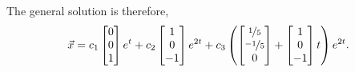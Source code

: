 \begin{exampleSol}
The general solution is therefore,
\begin{equation*}
\vec{x} =
c_1
\begin{bmatrix} 0 \\ 0 \\ 1 \end{bmatrix}
e^t
+
c_2 
\begin{bmatrix} 1 \\ 0 \\ -1 \end{bmatrix}
e^{2t}
+
c_3
\left(
\begin{bmatrix} \nicefrac{1}{5} \\ \nicefrac{-1}{5} \\ 0 \end{bmatrix}
+
\begin{bmatrix} 1 \\ 0 \\ -1 \end{bmatrix}
t
\right)
e^{2t}
.
\end{equation*}
\end{exampleSol}

